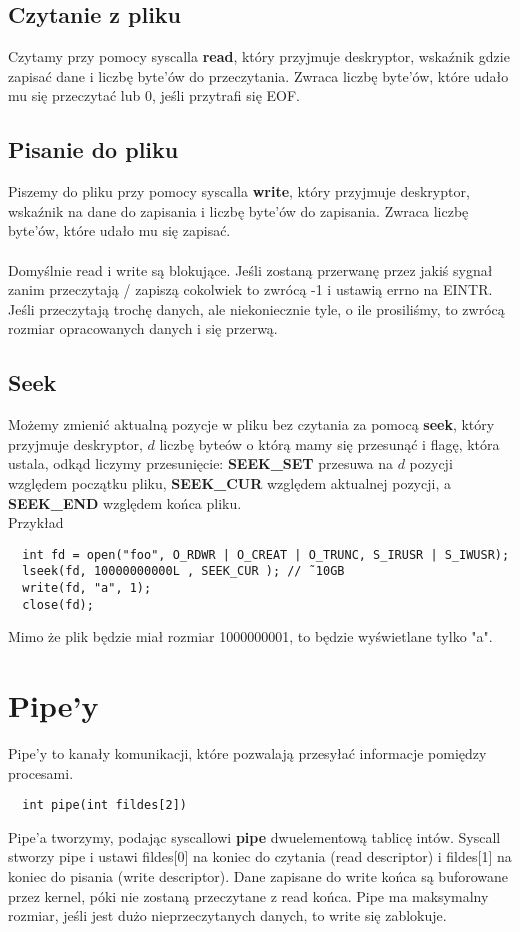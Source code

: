 \documentclass[12pt, a4paper, polish, openany]{book}
\begin{document}
\subsection{Czytanie z pliku}
Czytamy przy pomocy syscalla \textbf{read}, który przyjmuje deskryptor, wskaźnik gdzie zapisać dane i liczbę byte'ów do przeczytania. Zwraca liczbę byte'ów, które udało mu się przeczytać lub 0, jeśli przytrafi się EOF.
\subsection{Pisanie do pliku}
Piszemy do pliku przy pomocy syscalla \textbf{write}, który przyjmuje deskryptor, wskaźnik na dane do zapisania i liczbę byte'ów do zapisania. Zwraca liczbę byte'ów, które udało mu się zapisać.\\\\
Domyślnie read i write są blokujące. Jeśli zostaną przerwanę przez jakiś sygnał zanim przeczytają / zapiszą cokolwiek to zwrócą -1 i ustawią errno na EINTR. Jeśli przeczytają trochę danych, ale niekoniecznie tyle, o ile prosiliśmy, to zwrócą rozmiar opracowanych danych i się przerwą.
\subsection{Seek}
Możemy zmienić aktualną pozycje w pliku bez czytania za pomocą \textbf{seek}, który przyjmuje deskryptor, $d$ liczbę byteów o którą mamy się przesunąć i flagę, która ustala, odkąd liczymy przesunięcie: \textbf{SEEK\_SET} przesuwa na $d$ pozycji względem początku pliku, \textbf{SEEK\_CUR} względem aktualnej pozycji, a \textbf{SEEK\_END} względem końca pliku. \\
Przykład
\begin{verbatim}
  int fd = open("foo", O_RDWR | O_CREAT | O_TRUNC, S_IRUSR | S_IWUSR);
  lseek(fd, 10000000000L , SEEK_CUR ); // ˜10GB
  write(fd, "a", 1);
  close(fd);
\end{verbatim}
Mimo że plik będzie miał rozmiar 1000000001, to będzie wyświetlane tylko "a".
\section{Pipe'y}
Pipe'y to kanały komunikacji, które pozwalają przesyłać informacje pomiędzy procesami. 
\begin{verbatim}
  int pipe(int fildes[2])
\end{verbatim}
Pipe'a tworzymy, podając syscallowi \textbf{pipe} dwuelementową tablicę intów. Syscall stworzy pipe i ustawi fildes[0] na koniec do czytania (read descriptor) i fildes[1] na koniec do pisania (write descriptor). Dane zapisane do write końca są buforowane przez kernel, póki nie zostaną przeczytane z read końca. Pipe ma maksymalny rozmiar, jeśli jest dużo nieprzeczytanych danych, to write się zablokuje.
\end{document}
